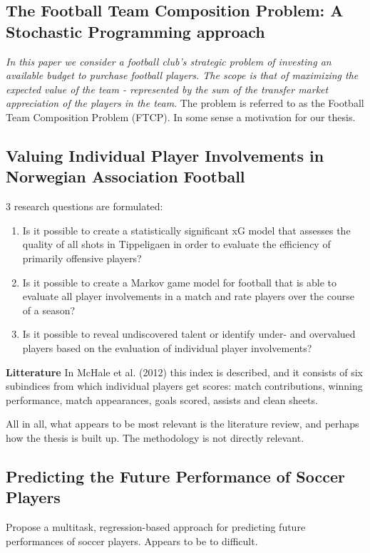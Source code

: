 \subsection{The Football Team Composition Problem: A Stochastic Programming approach}
\textit{In this paper we consider a football club’s strategic problem of investing an available budget to purchase football players. The scope is that of maximizing the expected value of the team - represented by the sum of the transfer market appreciation of the players in the team}. The problem is referred to as the Football Team Composition Problem (FTCP). In some sense a motivation for our thesis.

\subsection{Valuing Individual Player Involvements in
Norwegian Association Football}

3 research questions are formulated:
\begin{enumerate}
    \item Is it possible to create a statistically significant xG model that assesses the quality of all shots in Tippeligaen in order to evaluate the efficiency of primarily offensive players?
    \item Is it possible to create a Markov game model for football that is able to evaluate all player involvements in a match and rate players over the course of a season?
    \item Is it possible to reveal undiscovered talent or identify under- and overvalued players based on the evaluation of individual player involvements?
\end{enumerate} 

\textbf{Litterature}\newline
In McHale et al. (2012) this index is described, and it consists of six subindices from which individual players get scores: match contributions, winning performance, match appearances, goals scored, assists and clean sheets.\newpar

All in all, what appears to be most relevant is the literature review, and perhaps how the thesis is built up. The methodology is not directly relevant.

\subsection{Predicting the Future Performance of Soccer Players}
Propose a multitask, regression-based approach for predicting future performances of soccer players. Appears to be to difficult.

